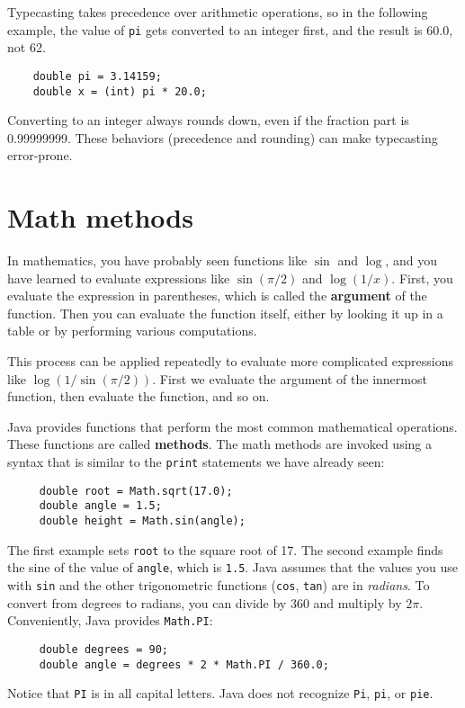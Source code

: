 \documentclass[12pt]{book}
\theoremstyle{definition}
\begin{document}
Typecasting takes precedence over arithmetic operations,
so in the following example, the value of {\tt pi} gets
converted to an integer first, and the result
is 60.0, not 62.

\begin{lstlisting}
    double pi = 3.14159;
    double x = (int) pi * 20.0;
\end{lstlisting}
% 
Converting to an integer always rounds down, even if the fraction
part is 0.99999999.  These behaviors (precedence and rounding)
can make typecasting error-prone.


\section{Math methods}

In mathematics, you have probably seen functions like $\sin$ and
$\log$, and you have learned to evaluate expressions like
$\sin(\pi/2)$ and $\log(1/x)$.  First, you evaluate the
expression in parentheses, which is called the {\bf argument} of the
function.
Then you can evaluate the function itself, either by looking it up in
a table or by performing various computations.

This process can be applied repeatedly to evaluate more complicated
expressions like $\log(1/\sin(\pi/2))$.  First we evaluate the
argument of the innermost function, then evaluate the function,
and so on.

Java provides functions that perform the most
common mathematical operations.  These functions
are called {\bf methods}.
The math methods are invoked using a syntax that is similar to
the {\tt print} statements we have already seen:

\begin{lstlisting}
     double root = Math.sqrt(17.0);
     double angle = 1.5;
     double height = Math.sin(angle);
\end{lstlisting}
%
The first example sets {\tt root} to the square root of 17.
The second example finds the sine of the value of {\tt angle},
which is {\tt 1.5}.  Java assumes that the
values you use with {\tt sin} and the other trigonometric functions
({\tt cos}, {\tt tan}) are in {\em radians}.  To
convert from degrees to radians, you can divide by 360
and multiply by $2 \pi$.  Conveniently, Java provides {\tt Math.PI}:

\begin{lstlisting}
     double degrees = 90;
     double angle = degrees * 2 * Math.PI / 360.0;
\end{lstlisting}
%
Notice that {\tt PI} is in all capital letters.  Java does
not recognize {\tt Pi}, {\tt pi}, or {\tt pie}.
\end{document}

